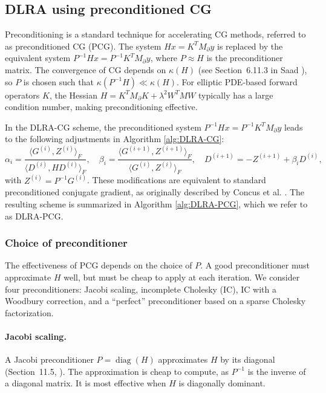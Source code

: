 \subsection{DLRA using preconditioned CG}
Preconditioning is a standard technique for accelerating CG methods, referred to as preconditioned CG (PCG). The system $H x = K^T M_\partial y$ is replaced by the equivalent system $P^{-1} H x = P^{-1} K^T M_\partial y$, where $P \approx H$ is the preconditioner matrix. The convergence of CG depends on $\kappa(H)$ (see Section~6.11.3 in Saad \cite{saadIterativeMethodsSparse2003}), so $P$ is chosen such that $\kappa(P^{-1} H) \ll \kappa(H)$. For elliptic PDE-based forward operators $K$, the Hessian $H = K^T M_\partial K + \lambda^2 W^T M W$ typically has a large condition number, making preconditioning effective.

In the DLRA-CG scheme, the preconditioned system $P^{-1} H x = P^{-1} K^T M_\partial y$ leads to the following adjustments in Algorithm \ref{alg:DLRA-CG}:
\begin{equation*}
    \alpha_i = \frac
    {\langle G^{(i)}, Z^{(i)} \rangle_F}
    {\langle D^{(i)}, H D^{(i)} \rangle_F}, \quad
    \beta_i = \frac
    {\langle G^{(i+1)}, Z^{(i+1)} \rangle_F}
    {\langle G^{(i)}, Z^{(i)} \rangle_F}, \quad
    D^{(i+1)} = -Z^{(i+1)} + \beta_i D^{(i)},
\end{equation*}
with $Z^{(i)} = P^{-1} G^{(i)}$. These modifications are equivalent to standard preconditioned conjugate gradient, as originally described by Concus et al. \cite{concusGeneralizedConjugateGradient1976}. The resulting scheme is summarized in Algorithm \ref{alg:DLRA-PCG}, which we refer to as DLRA-PCG.



\subsubsection{Choice of preconditioner}\label{sec:choice_of_preconditioner}
The effectiveness of PCG depends on the choice of $P$. A good preconditioner must approximate $H$ well, but must be cheap to apply at each iteration. We consider four preconditioners: Jacobi scaling, incomplete Cholesky (IC), IC with a Woodbury correction, and a ``perfect'' preconditioner based on a sparse Cholesky factorization.

\paragraph{Jacobi scaling.} A Jacobi preconditioner $P = \operatorname{diag}(H)$ approximates $H$ by its diagonal (Section~11.5, \cite{golubMatrixComputations4th2013}). The approximation is cheap to compute, as $P^{-1}$ is the inverse of a diagonal matrix. It is most effective when $H$ is diagonally dominant.
 
